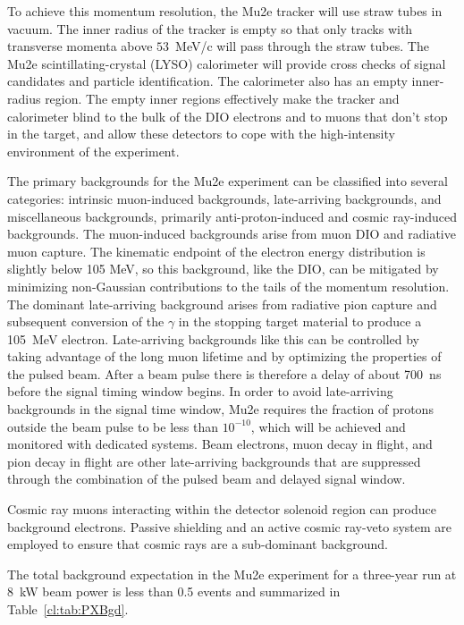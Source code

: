  
To achieve this momentum resolution, the Mu2e tracker will
use straw tubes in vacuum.  The inner radius of the tracker is empty
so that only tracks with transverse momenta above $53$~MeV/c will pass
through the straw tubes. The Mu2e scintillating-crystal (LYSO)
calorimeter will provide cross checks of signal candidates and
particle identification.  The calorimeter also has an empty inner-radius 
region.  The empty inner regions effectively make the tracker
and calorimeter blind to the bulk of the DIO electrons and  to muons that
don't stop in the target, and allow these detectors to cope with the
high-intensity environment of the experiment.


The primary backgrounds for the Mu2e experiment can be classified into
several categories: intrinsic muon-induced backgrounds, late-arriving
backgrounds, and miscellaneous backgrounds, primarily anti-proton-induced 
and cosmic ray-induced backgrounds. The muon-induced
backgrounds arise from muon DIO and radiative muon capture.  The
kinematic endpoint of the electron energy distribution is slightly
below 105 MeV, so this background, like the DIO, can be mitigated by
minimizing non-Gaussian contributions to the tails of the momentum
resolution.  The dominant late-arriving background arises from
radiative pion capture and subsequent conversion of the $\gamma$ in
the stopping target material to produce a 105~MeV electron.
Late-arriving backgrounds like this can be controlled by taking
advantage of the long muon lifetime and by optimizing the properties
of the pulsed beam.  After a beam pulse there is therefore a delay of about
700~ns before the signal timing window begins.  In order to avoid
late-arriving backgrounds in the signal time window, Mu2e requires the
fraction of protons outside the beam pulse to be less than $10^{-10}$,
which will be achieved and monitored with dedicated systems.  Beam
electrons, muon decay in flight, and pion decay in flight are other
late-arriving backgrounds that are suppressed through the combination of
the pulsed beam and delayed signal window.


Cosmic ray muons interacting within the detector solenoid region can
produce background electrons.  Passive shielding and an active
cosmic ray-veto system are employed to ensure that cosmic rays are a
sub-dominant background.
 

The total background expectation in the Mu2e experiment for a
three-year run at 8~kW beam power is less than 0.5 events and
summarized in Table~\ref{cl:tab:PXBgd}.

